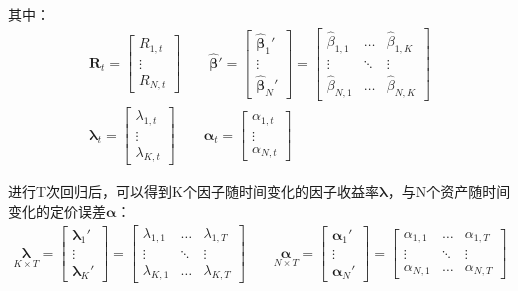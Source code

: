 \documentclass[11pt]{article}
\begin{document}
其中：
\begin{gather*}
    \bm{R}_t = \begin{bmatrix}R_{1,t} \\ \vdots \\ R_{N,t}\end{bmatrix}
    \qquad 
    \hat{\bm{\beta}}' = 
    \begin{bmatrix} \hat{\bm{\beta}}_{1}' \\ \vdots \\ \hat{\bm{\beta}}_{N}' \end{bmatrix} =
    \begin{bmatrix} \hat{\beta}_{1,1} & \dots & \hat{\beta}_{1,K} \\ \vdots & \ddots & \vdots \\ \hat{\beta}_{N,1} & \dots & \hat{\beta}_{N,K} \end{bmatrix}
    \\
    \bm{\lambda}_t = \begin{bmatrix}\lambda_{1,t} \\ \vdots \\ \lambda_{K,t} \end{bmatrix}
    \qquad
    \bm{\alpha}_t = \begin{bmatrix}\alpha_{1,t} \\ \vdots \\ \alpha_{N,t} \end{bmatrix}
\end{gather*}

进行T次回归后，可以得到K个因子随时间变化的因子收益率$\bm{\lambda}$，与N个资产随时间变化的定价误差$\bm{\alpha}$：
\begin{gather*}
    \underset{\scriptscriptstyle{K \times T}}{\bm{\lambda}}
    = \begin{bmatrix} \bm{\lambda}_{1}' \\ \vdots \\ \bm{\lambda}_{K}' \end{bmatrix}
    = \begin{bmatrix} \lambda_{1,1} & \dots & \lambda_{1,T} \\ \vdots & \ddots & \vdots \\ \lambda_{K,1} & \dots & \lambda_{K,T} \end{bmatrix}
    \qquad
    \underset{\scriptscriptstyle{N \times T}}{\bm{\alpha}}
    = \begin{bmatrix} \bm{\alpha}_{1}' \\ \vdots \\ \bm{\alpha}_{N}' \end{bmatrix}
    = \begin{bmatrix} \alpha_{1,1} & \dots & \alpha_{1,T} \\ \vdots & \ddots & \vdots \\ \alpha_{N,1} & \dots & \alpha_{N,T} \end{bmatrix}
\end{gather*}
\end{document}
